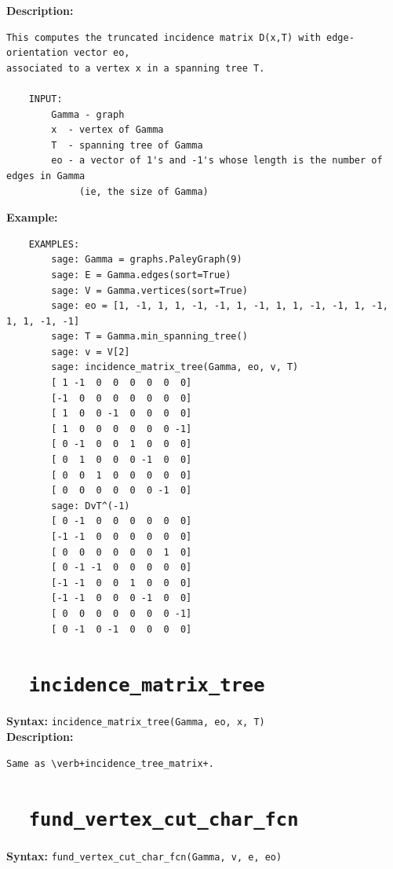 \documentclass{article}
\begin{document}
\textbf{Description:}
\begin{verbatim}
This computes the truncated incidence matrix D(x,T) with edge-orientation vector eo, 
associated to a vertex x in a spanning tree T.

    INPUT:
        Gamma - graph
        x  - vertex of Gamma
        T  - spanning tree of Gamma  
        eo - a vector of 1's and -1's whose length is the number of edges in Gamma
             (ie, the size of Gamma)

\end{verbatim}

\textbf{Example:}
\begin{verbatim}
    EXAMPLES:
        sage: Gamma = graphs.PaleyGraph(9)
        sage: E = Gamma.edges(sort=True)
        sage: V = Gamma.vertices(sort=True)
        sage: eo = [1, -1, 1, 1, -1, -1, 1, -1, 1, 1, -1, -1, 1, -1, 1, 1, -1, -1]
        sage: T = Gamma.min_spanning_tree()
        sage: v = V[2]
        sage: incidence_matrix_tree(Gamma, eo, v, T)
        [ 1 -1  0  0  0  0  0  0]
        [-1  0  0  0  0  0  0  0]
        [ 1  0  0 -1  0  0  0  0]
        [ 1  0  0  0  0  0  0 -1]
        [ 0 -1  0  0  1  0  0  0]
        [ 0  1  0  0  0 -1  0  0]
        [ 0  0  1  0  0  0  0  0]
        [ 0  0  0  0  0  0 -1  0]
        sage: DvT^(-1)
        [ 0 -1  0  0  0  0  0  0]
        [-1 -1  0  0  0  0  0  0]
        [ 0  0  0  0  0  0  1  0]
        [ 0 -1 -1  0  0  0  0  0]
        [-1 -1  0  0  1  0  0  0]
        [-1 -1  0  0  0 -1  0  0]
        [ 0  0  0  0  0  0  0 -1]
        [ 0 -1  0 -1  0  0  0  0]
\end{verbatim}

\section{\tt \ \ incidence\_matrix\_tree}

\textbf{Syntax:} \verb}incidence_matrix_tree(Gamma, eo, x, T)}\\

\textbf{Description:}
\begin{verbatim}
Same as \verb+incidence_tree_matrix+.
\end{verbatim}


\section{\tt \ \ fund\_vertex\_cut\_char\_fcn}

\textbf{Syntax:} \verb}fund_vertex_cut_char_fcn(Gamma, v, e, eo)}\\
\end{document}

